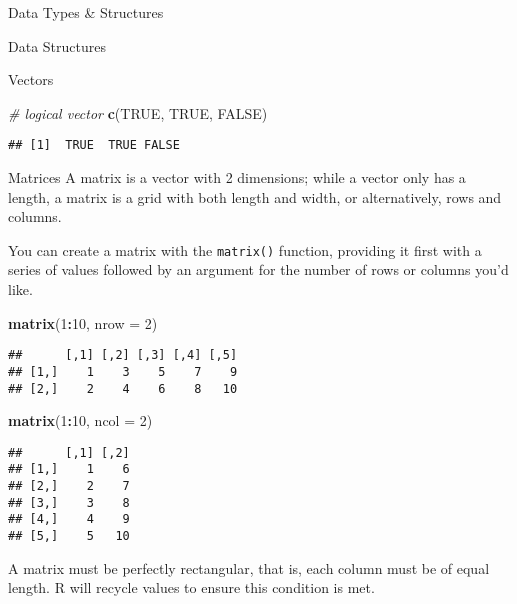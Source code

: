 \documentclass[
  ignorenonframetext,
]{beamer}
\newenvironment{Shaded}{\begin{snugshade}}{\end{snugshade}}
\newcommand{\AttributeTok}[1]{\textcolor[rgb]{0.13,0.29,0.53}{#1}}
\newcommand{\CommentTok}[1]{\textcolor[rgb]{0.56,0.35,0.01}{\textit{#1}}}
\newcommand{\ConstantTok}[1]{\textcolor[rgb]{0.56,0.35,0.01}{#1}}
\newcommand{\DecValTok}[1]{\textcolor[rgb]{0.00,0.00,0.81}{#1}}
\newcommand{\FunctionTok}[1]{\textcolor[rgb]{0.13,0.29,0.53}{\textbf{#1}}}
\newcommand{\NormalTok}[1]{#1}
\newcommand{\SpecialCharTok}[1]{\textcolor[rgb]{0.81,0.36,0.00}{\textbf{#1}}}
\begin{document}
\begin{frame}[fragile]{Data Types \& Structures}
\begin{block}{Data Structures}
\begin{block}{Vectors}
\begin{Shaded}
\begin{Highlighting}[]
\CommentTok{\# logical vector}
\FunctionTok{c}\NormalTok{(}\ConstantTok{TRUE}\NormalTok{, }\ConstantTok{TRUE}\NormalTok{, }\ConstantTok{FALSE}\NormalTok{)}
\end{Highlighting}
\end{Shaded}

\begin{verbatim}
## [1]  TRUE  TRUE FALSE
\end{verbatim}
\end{block}

\begin{block}{Matrices}
\protect\hypertarget{matrices}{}
A matrix is a vector with 2 dimensions; while a vector only has a
length, a matrix is a grid with both length and width, or alternatively,
rows and columns.

You can create a matrix with the \texttt{matrix()} function, providing
it first with a series of values followed by an argument for the number
of rows or columns you'd like.

\begin{Shaded}
\begin{Highlighting}[]
\FunctionTok{matrix}\NormalTok{(}\DecValTok{1}\SpecialCharTok{:}\DecValTok{10}\NormalTok{, }\AttributeTok{nrow =} \DecValTok{2}\NormalTok{)}
\end{Highlighting}
\end{Shaded}

\begin{verbatim}
##      [,1] [,2] [,3] [,4] [,5]
## [1,]    1    3    5    7    9
## [2,]    2    4    6    8   10
\end{verbatim}

\begin{Shaded}
\begin{Highlighting}[]
\FunctionTok{matrix}\NormalTok{(}\DecValTok{1}\SpecialCharTok{:}\DecValTok{10}\NormalTok{, }\AttributeTok{ncol =} \DecValTok{2}\NormalTok{)}
\end{Highlighting}
\end{Shaded}

\begin{verbatim}
##      [,1] [,2]
## [1,]    1    6
## [2,]    2    7
## [3,]    3    8
## [4,]    4    9
## [5,]    5   10
\end{verbatim}

A matrix must be perfectly rectangular, that is, each column must be of
equal length. R will recycle values to ensure this condition is met.


\end{block}
\end{block}
\end{frame}
\end{document}
